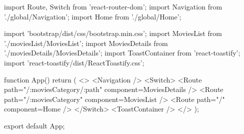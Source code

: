 import { Route, Switch } from 'react-router-dom';
import Navigation from './global/Navigation';
import Home from './global/Home';

import 'bootstrap/dist/css/bootstrap.min.css';
import MoviesList from './moviesList/MoviesList';
import MoviesDetails from './moviesDetails/MoviesDetails';
import { ToastContainer } from 'react-toastify';
import 'react-toastify/dist/ReactToastify.css';

function App() {
  return (
    <>
      <Navigation />
      <Switch>
        <Route path="/:moviesCategory/:path" component={MoviesDetails} />
        <Route path="/:moviesCategory" component={MoviesList} />
        <Route path="/" component={Home} />
      </Switch>
      <ToastContainer />
    </>
  );
}

export default App;